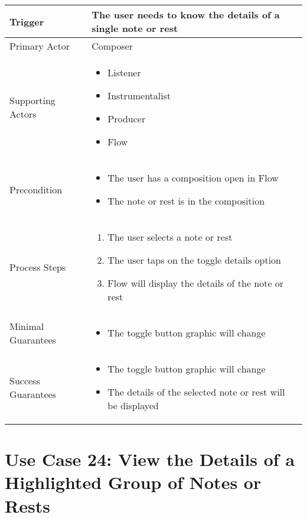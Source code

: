   \begin{tabularx}{\textwidth}{|X|X|}
  \hline
  Trigger & 
  The user needs to know the details of a single note or rest\\
  \hline
  Primary Actor & 
  Composer \\
  \hline
  Supporting Actors & 
  \begin{itemize}
  \item Listener
  \item Instrumentalist
  \item Producer
  \item Flow
  \end{itemize} \\
  \hline
  Precondition & 
  \begin{itemize}
  \item The user has a composition open in Flow
  \item The note or rest is in the composition
  \end{itemize} \\
  \hline
  Process Steps & 
  \begin{enumerate}
  \item The user selects a note or rest
  \item The user taps on the toggle details option
  \item Flow will display the details of the note or rest
  \end{enumerate} \\
  \hline
  Minimal Guarantees & 
  \begin{itemize}
    \item The toggle button graphic will change
  \end{itemize} \\
  \hline
  Success Guarantees & 
  \begin{itemize}
    \item The toggle button graphic will change
    \item The details of the selected note or rest will be displayed 
  \end{itemize} \\
  \hline
  \end{tabularx}


  \section{Use Case 24: View the Details of a Highlighted Group of Notes or Rests}


